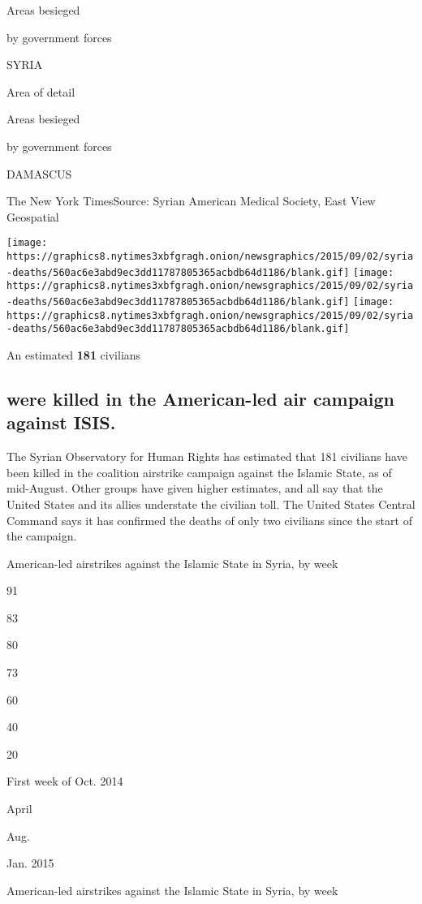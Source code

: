 Areas besieged

by government forces

SYRIA

Area of detail

Areas besieged

by government forces

DAMASCUS

The New York Times\textbar{}Source: Syrian American Medical Society,
East View Geospatial

\texttt{[image: https://graphics8.nytimes3xbfgragh.onion/newsgraphics/2015/09/02/syria-deaths/560ac6e3abd9ec3dd11787805365acbdb64d1186/blank.gif]}
\texttt{[image: https://graphics8.nytimes3xbfgragh.onion/newsgraphics/2015/09/02/syria-deaths/560ac6e3abd9ec3dd11787805365acbdb64d1186/blank.gif]}
\texttt{[image: https://graphics8.nytimes3xbfgragh.onion/newsgraphics/2015/09/02/syria-deaths/560ac6e3abd9ec3dd11787805365acbdb64d1186/blank.gif]}

An estimated \textbf{181} civilians

\hypertarget{were-killed-in-the-american-led-air-campaign-against-isis}{%
\subsection{were killed in the American-led air campaign against
ISIS.}\label{were-killed-in-the-american-led-air-campaign-against-isis}}

The Syrian Observatory for Human Rights has estimated that 181 civilians
have been killed in the coalition airstrike campaign against the Islamic
State, as of mid-August. Other groups have given higher estimates, and
all say that the United States and its allies understate the civilian
toll. The United States Central Command says it has confirmed the deaths
of only two civilians since the start of the campaign.

American-led airstrikes against the Islamic State in Syria, by week

91

83

80

73

60

40

20

First week of Oct. 2014

April

Aug.

Jan. 2015

American-led airstrikes against the Islamic State in Syria, by week

